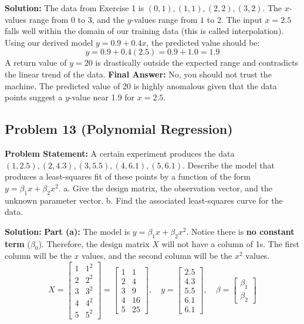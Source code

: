 \documentclass[11pt, letterpaper]{article}
\theoremstyle{definition}
\theoremstyle{remark}
\begin{document}
\textbf{Solution:}
The data from Exercise 1 is $(0, 1), (1, 1), (2, 2), (3, 2)$. The $x$-values range from $0$ to $3$, and the $y$-values range from $1$ to $2$. 
The input $x = 2.5$ falls well within the domain of our training data (this is called interpolation). 
Using our derived model $y = 0.9 + 0.4x$, the predicted value should be:
\[ y = 0.9 + 0.4(2.5) = 0.9 + 1.0 = 1.9 \]
A return value of $y = 20$ is drastically outside the expected range and contradicts the linear trend of the data. 
\textbf{Final Answer:} No, you should not trust the machine. The predicted value of 20 is highly anomalous given that the data points suggest a $y$-value near 1.9 for $x = 2.5$.

\subsection*{Problem 13 (Polynomial Regression)}
\textbf{Problem Statement:} A certain experiment produces the data $(1, 2.5), (2, 4.3), (3, 5.5), (4, 6.1), (5, 6.1)$. Describe the model that produces a least-squares fit of these points by a function of the form $y = \beta_1 x + \beta_2 x^2$. 
a. Give the design matrix, the observation vector, and the unknown parameter vector.
b. Find the associated least-squares curve for the data.

\textbf{Solution:}
\textbf{Part (a):} The model is $y = \beta_1 x + \beta_2 x^2$. Notice there is \textbf{no constant term} ($\beta_0$). Therefore, the design matrix $X$ will not have a column of 1s. The first column will be the $x$ values, and the second column will be the $x^2$ values.
\[
X = \begin{bmatrix} 1 & 1^2 \\ 2 & 2^2 \\ 3 & 3^2 \\ 4 & 4^2 \\ 5 & 5^2 \end{bmatrix} = \begin{bmatrix} 1 & 1 \\ 2 & 4 \\ 3 & 9 \\ 4 & 16 \\ 5 & 25 \end{bmatrix}, \quad y = \begin{bmatrix} 2.5 \\ 4.3 \\ 5.5 \\ 6.1 \\ 6.1 \end{bmatrix}, \quad \beta = \begin{bmatrix} \beta_1 \\ \beta_2 \end{bmatrix}
\]
\end{document}
